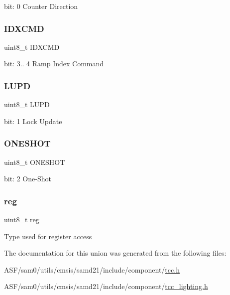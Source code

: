 bit\+: 0 Counter Direction \mbox{\label{union_t_c_c___c_t_r_l_b_c_l_r___type_abcff3047a0fc0306fbcbb7fac8c26b97}} 
\subsubsection{\texorpdfstring{IDXCMD}{IDXCMD}}
{\footnotesize\ttfamily uint8\+\_\+t I\+D\+X\+C\+MD}

bit\+: 3.. 4 Ramp Index Command \mbox{\label{union_t_c_c___c_t_r_l_b_c_l_r___type_a8ac44d571fac48acf217bb9425d04bdb}} 
\subsubsection{\texorpdfstring{LUPD}{LUPD}}
{\footnotesize\ttfamily uint8\+\_\+t L\+U\+PD}

bit\+: 1 Lock Update \mbox{\label{union_t_c_c___c_t_r_l_b_c_l_r___type_a7b9c94dc8f69244e81941bd1c96ca561}} 
\subsubsection{\texorpdfstring{ONESHOT}{ONESHOT}}
{\footnotesize\ttfamily uint8\+\_\+t O\+N\+E\+S\+H\+OT}

bit\+: 2 One-\/\+Shot \mbox{\label{union_t_c_c___c_t_r_l_b_c_l_r___type_a9428adc9af4653a2050e2536b55dec8d}} 
\subsubsection{\texorpdfstring{reg}{reg}}
{\footnotesize\ttfamily uint8\+\_\+t reg}

Type used for register access 

The documentation for this union was generated from the following files\+:\begin{DoxyCompactItemize}
\item 
A\+S\+F/sam0/utils/cmsis/samd21/include/component/\mbox{\hyperlink{tcc_8h}{tcc.\+h}}\item 
A\+S\+F/sam0/utils/cmsis/samd21/include/component/\mbox{\hyperlink{tcc__lighting_8h}{tcc\+\_\+lighting.\+h}}\end{DoxyCompactItemize}
